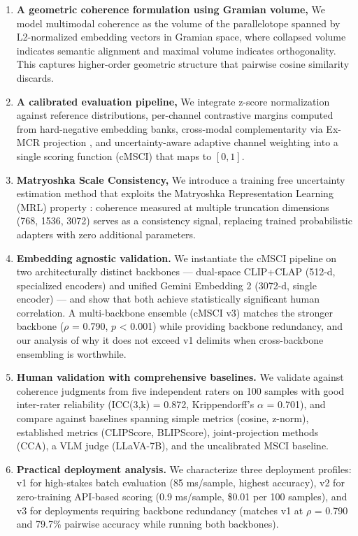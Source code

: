 \documentclass[a4paper,fleqn]{cas-sc}
\begin{document}
\begin{enumerate}
\item \textbf{A geometric coherence formulation using Gramian volume,} We model multimodal coherence as the volume of the parallelotope spanned by L2-normalized embedding vectors in Gramian space, where collapsed volume indicates semantic alignment and maximal volume indicates orthogonality. This captures higher-order geometric structure that pairwise cosine similarity discards.

\item \textbf{A calibrated evaluation pipeline,} We integrate z-score normalization against reference distributions, per-channel contrastive margins computed from hard-negative embedding banks, cross-modal complementarity via Ex-MCR projection \citep{wang2023exmcr}, and uncertainty-aware adaptive channel weighting into a single scoring function (cMSCI) that maps to $[0, 1]$.

\item \textbf{Matryoshka Scale Consistency,} We introduce a training free uncertainty estimation method that exploits the Matryoshka Representation Learning (MRL) property \citep{kusupati2022matryoshka}: coherence measured at multiple truncation dimensions (768, 1536, 3072) serves as a consistency signal, replacing trained probabilistic adapters with zero additional parameters.

\item \textbf{Embedding agnostic validation.} We instantiate the cMSCI pipeline on two architecturally distinct backbones — dual-space CLIP+CLAP (512-d, specialized encoders) and unified Gemini Embedding 2 (3072-d, single encoder) — and show that both achieve statistically significant human correlation. A multi-backbone ensemble (cMSCI v3) matches the stronger backbone ($\rho$ = 0.790, $p$ < 0.001) while providing backbone redundancy, and our analysis of why it does not exceed v1 delimits when cross-backbone ensembling is worthwhile.

\item \textbf{Human validation with comprehensive baselines.} We validate against coherence judgments from five independent raters on 100 samples with good inter-rater reliability (ICC(3,k) = 0.872, Krippendorff's $\alpha$ = 0.701), and compare against baselines spanning simple metrics (cosine, z-norm), established metrics (CLIPScore, BLIPScore), joint-projection methods (CCA), a VLM judge (LLaVA-7B), and the uncalibrated MSCI baseline.

\item \textbf{Practical deployment analysis.} We characterize three deployment profiles: v1 for high-stakes batch evaluation (85 ms/sample, highest accuracy), v2 for zero-training API-based scoring (0.9 ms/sample, \$0.01 per 100 samples), and v3 for deployments requiring backbone redundancy (matches v1 at $\rho$ = 0.790 and 79.7\% pairwise accuracy while running both backbones).
\end{enumerate}
\end{document}
